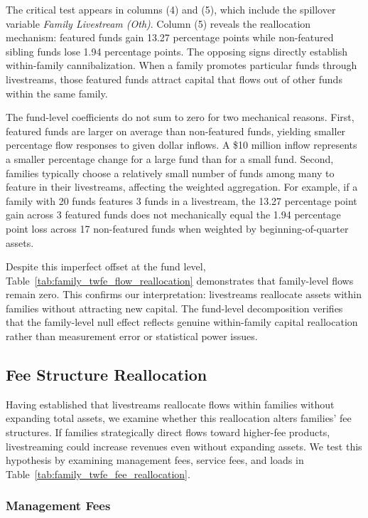 \documentclass[12pt]{article}
\begin{document}
The critical test appears in columns (4) and (5), which include the spillover variable \textit{Family Livestream (Oth)}. Column (5) reveals the reallocation mechanism: featured funds gain 13.27 percentage points while non-featured sibling funds lose 1.94 percentage points. The opposing signs directly establish within-family cannibalization. When a family promotes particular funds through livestreams, those featured funds attract capital that flows out of other funds within the same family.

The fund-level coefficients do not sum to zero for two mechanical reasons. First, featured funds are larger on average than non-featured funds, yielding smaller percentage flow responses to given dollar inflows. A \$10 million inflow represents a smaller percentage change for a large fund than for a small fund. Second, families typically choose a relatively small number of funds among many to feature in their livestreams, affecting the weighted aggregation. For example, if a family with 20 funds features 3 funds in a livestream, the 13.27 percentage point gain across 3 featured funds does not mechanically equal the 1.94 percentage point loss across 17 non-featured funds when weighted by beginning-of-quarter assets.

Despite this imperfect offset at the fund level, Table~\ref{tab:family_twfe_flow_reallocation} demonstrates that family-level flows remain zero. This confirms our interpretation: livestreams reallocate assets within families without attracting new capital. The fund-level decomposition verifies that the family-level null effect reflects genuine within-family capital reallocation rather than measurement error or statistical power issues.
\subsection{Fee Structure Reallocation}\label{subsec:fee_reallocation}

Having established that livestreams reallocate flows within families without expanding total assets, we examine whether this reallocation alters families' fee structures. If families strategically direct flows toward higher-fee products, livestreaming could increase revenues even without expanding assets. We test this hypothesis by examining management fees, service fees, and loads in Table~\ref{tab:family_twfe_fee_reallocation}.

\subsubsection{Management Fees}
\end{document}
